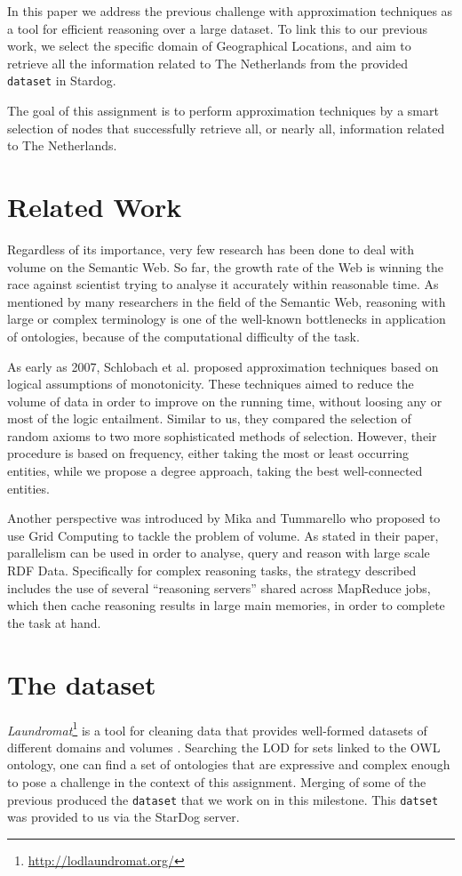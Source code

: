 \documentclass[runningheads,a4paper]{../../StyleFiles/llncs}
\begin{document}
In this paper we address the previous challenge with approximation techniques as a tool for efficient reasoning over a large dataset. To link this to our previous work, we select the specific domain of Geographical Locations, and aim to retrieve all the information related to The Netherlands from the provided \texttt{dataset} in Stardog.  

The goal of this assignment is to perform approximation techniques by a smart selection of nodes that successfully retrieve all, or nearly all, information related to The Netherlands. 

\section{Related Work}
Regardless of its importance, very few research has been done to deal with volume on the Semantic Web. So far, the growth rate of the Web is winning the race against scientist trying to analyse it accurately within reasonable time. As mentioned by many researchers in the field of the Semantic Web, reasoning with large or complex terminology is one of the well-known bottlenecks in application of ontologies, because of the computational difficulty of the task.

As early as 2007, Schlobach et al. \cite{schlobach2007anytime} proposed approximation techniques based on logical assumptions of monotonicity. These techniques aimed to reduce the volume of data in order to improve on the running time, without loosing any or most of the logic entailment. Similar to us, they compared the selection of random axioms to two more sophisticated methods of selection. However, their procedure is based on frequency, either taking the most or least occurring entities, while we propose a degree approach, taking the best well-connected entities.

Another perspective was introduced by Mika and Tummarello \cite{mika2008web} who proposed to use Grid Computing to tackle the problem of volume. As stated in their paper, parallelism can be used in order to analyse, query and reason with large scale RDF Data. Specifically for complex reasoning tasks, the strategy described includes the use of several “reasoning servers” shared across MapReduce jobs, which then cache reasoning results in large main memories, in order to complete the task at hand.

\section{The dataset}
\textit{Laundromat}\footnote{\url{http://lodlaundromat.org/}} is a tool for cleaning data that provides well-formed datasets of different domains and volumes \cite{beek2014lod}. Searching the LOD for sets linked to the OWL ontology, one can find a set of ontologies that are expressive and complex enough to pose a challenge in the context of this assignment. Merging of some of the previous produced the \texttt{dataset} that we work on in this milestone. This \texttt{datset} was provided to us via the StarDog server. 
\end{document}
